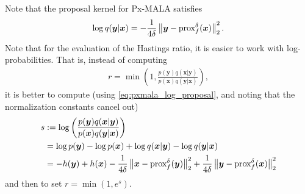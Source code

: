 \documentclass[10pt]{article}
\numberwithin{equation}{section}
\begin{document}
Note that the proposal kernel for Px-MALA satisfies
\begin{align}
\log q(\bm y | \bm x) = - \frac{1}{4\delta}\left\|\bm y - \text{prox}_{f}^{\delta}(\bm x)\right\|_2^2. \label{eq:pxmala_log_proposal}
\end{align}
Note that for the evaluation of the Hastings ratio, it is easier to work with log-probabilities. That is, instead of computing
\begin{align*}
r = \min \left( 1, \frac{p(\bm y) q(\bm x | \bm y)}{p(\bm x) q(\bm y | \bm x)} \right),
\end{align*}
it is better to compute (using \eqref{eq:pxmala_log_proposal}, and noting that the normalization constants cancel out)
\begin{align*}
s & := \log \left(\frac{p(\bm y) q(\bm x | \bm y)}{p(\bm x) q(\bm y | \bm x)} \right) \\
& = \log p(\bm y) - \log p(\bm x) + \log q(\bm x | \bm y) - \log q(\bm y | \bm x) \\
& = - h(\bm y) + h(\bm x) - \frac{1}{4 \delta}\left\|\bm x - \text{prox}_{f}^{\delta}(\bm y)\right\|_2^2 + \frac{1}{4 \delta}\left\|\bm y - \text{prox}_{f}^{\delta}(\bm x)\right\|_2^2
\end{align*}
and then to set $r = \min(1, e^s)$.
\end{document}
